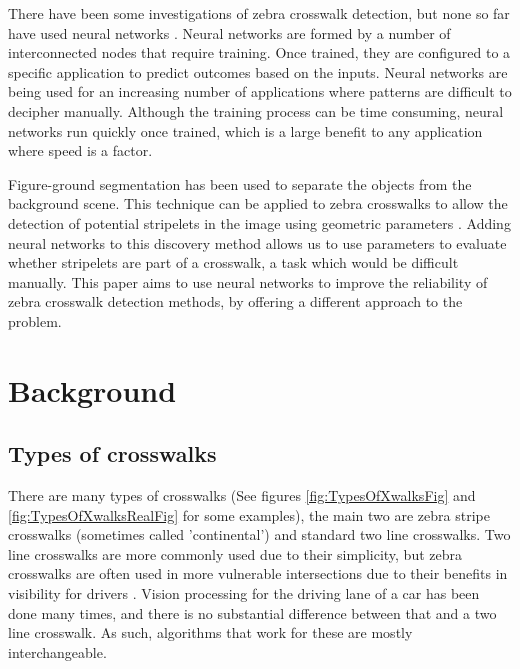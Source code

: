 \documentclass[12pt]{ucthesis}
\begin{document}
There have been some investigations of zebra crosswalk detection, but none so far have used neural networks \cite{Coughlan2006}\cite{ZebraPhone}\cite{relatedworkbipolarity}. Neural networks are formed by a number of interconnected nodes that require training. Once trained, they are configured to a specific application to predict outcomes based on the inputs. Neural networks are being used for an increasing number of applications where patterns are difficult to decipher manually. Although the training process can be time consuming, neural networks run quickly once trained, which is a large benefit to any application where speed is a factor. 

Figure-ground segmentation has been used to separate the objects from the background scene. This technique can be applied to zebra crosswalks to allow the detection of potential stripelets in the image using geometric parameters \cite{Coughlan2006}. Adding neural networks to this discovery method allows us to use parameters to evaluate whether stripelets are part of a crosswalk, a task which would be difficult manually. This paper aims to use neural networks to improve the reliability of zebra crosswalk detection methods, by offering a different approach to the problem.



\chapter{Background}
\section{Types of crosswalks}

There are many types of crosswalks (See figures \ref{fig:TypesOfXwalksFig} and \ref{fig:TypesOfXwalksRealFig} for some examples), the main two are zebra stripe crosswalks (sometimes called 'continental') and standard two line crosswalks. Two line crosswalks are more commonly used due to their simplicity, but zebra crosswalks are often used in more vulnerable intersections due to their benefits in visibility for drivers \cite{crosswalkTypeEvaluation}. Vision processing for the driving lane of a car has been done many times, and there is no substantial difference between that and a two line crosswalk. As such, algorithms that work for these are mostly interchangeable.
\end{document}
